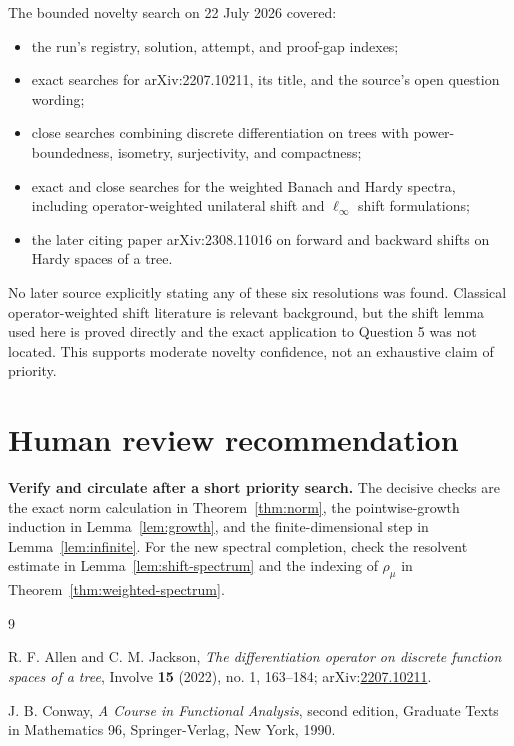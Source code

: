 \documentclass[11pt]{article}
\begin{document}
The bounded novelty search on 22 July 2026 covered:
\begin{itemize}
  \item the run's registry, solution, attempt, and proof-gap indexes;
  \item exact searches for arXiv:2207.10211, its title, and the source's open
  question wording;
  \item close searches combining discrete differentiation on trees with
  power-boundedness, isometry, surjectivity, and compactness;
  \item exact and close searches for the weighted Banach and Hardy spectra,
  including operator-weighted unilateral shift and $\ell_\infty$ shift
  formulations;
  \item the later citing paper arXiv:2308.11016 on forward and backward shifts
  on Hardy spaces of a tree.
\end{itemize}
No later source explicitly stating any of these six resolutions was found.
Classical operator-weighted shift literature is relevant background, but the
shift lemma used here is proved directly and the exact application to Question
5 was not located. This supports moderate novelty confidence, not an
exhaustive claim of priority.

\section*{Human review recommendation}

\textbf{Verify and circulate after a short priority search.} The decisive
checks are the exact norm calculation in Theorem~\ref{thm:norm}, the
pointwise-growth induction in Lemma~\ref{lem:growth}, and the finite-dimensional
step in Lemma~\ref{lem:infinite}. For the new spectral completion, check the
resolvent estimate in Lemma~\ref{lem:shift-spectrum} and the indexing of
$\rho_\mu$ in Theorem~\ref{thm:weighted-spectrum}.

\begin{thebibliography}{9}

R. F. Allen and C. M. Jackson,
\emph{The differentiation operator on discrete function spaces of a tree},
Involve \textbf{15} (2022), no. 1, 163--184;
arXiv:\href{https://arxiv.org/abs/2207.10211}{2207.10211}.

J. B. Conway,
\emph{A Course in Functional Analysis}, second edition,
Graduate Texts in Mathematics 96, Springer-Verlag, New York, 1990.

\end{thebibliography}
\end{document}
